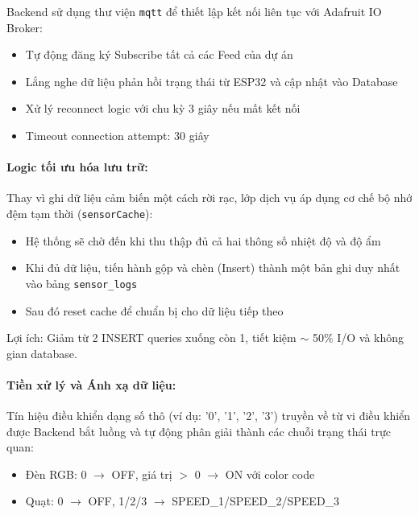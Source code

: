 Backend sử dụng thư viện \texttt{mqtt} để thiết lập kết nối liên tục với Adafruit IO Broker:

\begin{itemize}
    \item Tự động đăng ký Subscribe tất cả các Feed của dự án
    \item Lắng nghe dữ liệu phản hồi trạng thái từ ESP32 và cập nhật vào Database
    \item Xử lý reconnect logic với chu kỳ 3 giây nếu mất kết nối
    \item Timeout connection attempt: 30 giây
\end{itemize}

\paragraph{Logic tối ưu hóa lưu trữ:}

Thay vì ghi dữ liệu cảm biến một cách rời rạc, lớp dịch vụ áp dụng cơ chế bộ nhớ đệm tạm thời (\texttt{sensorCache}):

\begin{itemize}
    \item Hệ thống sẽ chờ đến khi thu thập đủ cả hai thông số nhiệt độ và độ ẩm
    \item Khi đủ dữ liệu, tiến hành gộp và chèn (Insert) thành một bản ghi duy nhất vào bảng \texttt{sensor\_logs}
    \item Sau đó reset cache để chuẩn bị cho dữ liệu tiếp theo
\end{itemize}

Lợi ích: Giảm từ 2 INSERT queries xuống còn 1, tiết kiệm $\sim$ 50\% I/O và không gian database.

\paragraph{Tiền xử lý và Ánh xạ dữ liệu:}

Tín hiệu điều khiển dạng số thô (ví dụ: '0', '1', '2', '3') truyền về từ vi điều khiển được Backend bắt luồng và tự động phân giải thành các chuỗi trạng thái trực quan:

\begin{itemize}
    \item Đèn RGB: 0 $\rightarrow$ OFF, giá trị $>$ 0 $\rightarrow$ ON với color code
    \item Quạt: 0 $\rightarrow$ OFF, 1/2/3 $\rightarrow$ SPEED\_1/SPEED\_2/SPEED\_3
\end{itemize}

